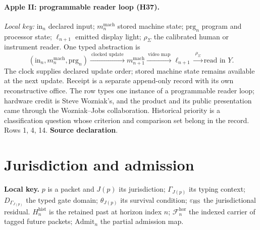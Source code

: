 \documentclass[11pt,a4paper]{article}
\newcommand{\st}[1]{\textsf{\small\textbf{#1}}}
\newcommand{\Ssrc}{\st{Source declaration}}\newcommand{\Sint}{\st{Interface}}
\newcommand{\lkey}[1]{\par\noindent\textbf{Local key.} #1\par\smallskip}
\theoremstyle{plain}
\theoremstyle{definition}
\theoremstyle{remark}
\begin{document}
\paragraph{Apple II: programmable reader loop (H37).} \emph{Local key:} $\mathrm{in}_n$ declared input; $m^{\mathrm{mach}}_n$ stored machine state; $\mathrm{prg}_n$ program and processor state; $\ell_{n+1}$ emitted display light; $\rho_\Sigma$ the calibrated human or instrument reader. One typed abstraction is
\[
(\mathrm{in}_n,m^{\mathrm{mach}}_n,\mathrm{prg}_n)\xrightarrow{\ \text{clocked update}\ }m^{\mathrm{mach}}_{n+1}\xrightarrow{\ \text{video map}\ }\ell_{n+1}\xrightarrow{\ \rho_\Sigma\ }\text{read in }Y .
\]
The clock supplies declared update order; stored machine state remains available at the next update. Receipt is a separate append-only record with its own reconstructive office. The row types one instance of a programmable reader loop; hardware credit is Steve Wozniak's, and the product and its public presentation came through the Wozniak--Jobs collaboration. Historical priority is a classification question whose criterion and comparison set belong in the record. Rows 1, 4, 14. \Ssrc.
\section{Jurisdiction and admission}\label{sec:jur}
\lkey{$p$ is a packet and $J(p)$ its jurisdiction; $\Gamma_{J(p)}$ its typing context; $D_{\Gamma_{J(p)}}$ the typed gate domain; $\theta_{J(p)}$ its survival condition; $\varepsilon_{\mathrm{HS}}$ the jurisdictional residual. $H^{\mathrm{hist}}_n$ is the retained past at horizon index $n$; $\mathcal F^{\mathrm{hor}}_n$ the indexed carrier of tagged future packets; $\mathrm{Admit}_n$ the partial admission map.}
\end{document}

